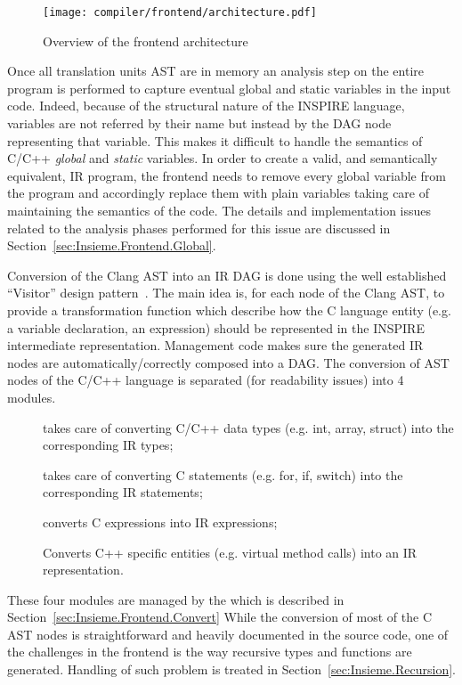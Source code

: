 \begin{figure}[tb]
	\centering
	\texttt{[image: compiler/frontend/architecture.pdf]}
	\caption{Overview of the frontend architecture}
	\label{fig:Frontend.Architecture}
\end{figure}

Once all translation units AST are in memory an analysis step on the entire
program is performed to capture eventual global and static variables in the
input code.  Indeed, because of the structural nature of the INSPIRE language,
variables are not referred by their name but instead by the DAG node
representing that variable. This makes it difficult to handle the semantics of
C/C++ \emph{global} and \emph{static} variables. In order to create a valid, and
semantically equivalent, IR program, the frontend needs to remove every global
variable from the program and accordingly replace them with plain variables
taking care of maintaining the semantics of the code. The details and
implementation issues related to the analysis phases performed for this issue
are discussed in Section~\ref{sec:Insieme.Frontend.Global}. 

Conversion of the Clang AST into an IR DAG is done using the well established
``Visitor'' design pattern~\cite{visitor-pattern}. The main idea is, for each
node of the Clang AST, to provide a transformation function which describe how
the C language entity (e.g. a variable declaration, an expression) should be
represented in the INSPIRE intermediate representation.  Management code makes
sure the generated IR nodes are automatically/correctly composed into a DAG. The
conversion of AST nodes of the C/C++ language is separated (for readability
issues) into 4 modules. 
\begin{description}
\item [] takes care of converting C/C++ data types (e.g. int,
array, struct) into the
corresponding IR types;
\item [] takes care of converting C statements (e.g. for, if,
switch) into the corresponding IR statements;
\item [] converts C expressions into IR expressions;
\item [] Converts C++ specific entities (e.g. virtual method
calls) into an IR representation.
\end{description}
These four modules are managed by the  which is described
in Section~\ref{sec:Insieme.Frontend.Convert}
While the conversion of most of the C AST nodes is straightforward and heavily
documented in the source code, one of the challenges in the frontend is the way
recursive types and functions are generated. Handling of such problem is treated
in Section~\ref{sec:Insieme.Recursion}.

